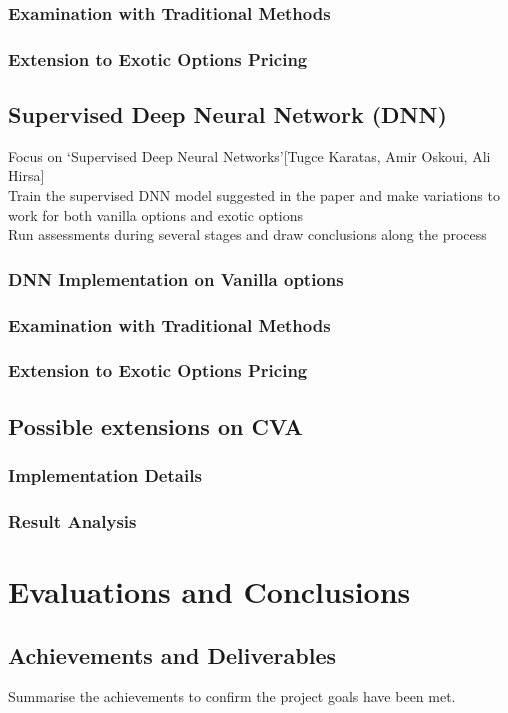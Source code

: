 \documentclass{report}
\begin{document}
\subsection{Examination with Traditional Methods}
\subsection{Extension to Exotic Options Pricing}

\section{Supervised Deep Neural Network (DNN)}
Focus on ‘Supervised Deep Neural Networks’[Tugce Karatas, Amir Oskoui, Ali Hirsa]\\
Train the supervised DNN model suggested in the paper and make variations to work for both vanilla options and exotic options\\
Run assessments during several stages and draw conclusions along the process

\subsection{DNN Implementation on Vanilla options}
\subsection{Examination with Traditional Methods}
\subsection{Extension to Exotic Options Pricing}

\section{Possible extensions on CVA}
\subsection{Implementation Details}
\subsection{Result Analysis}


\chapter{Evaluations and Conclusions}
\section{Achievements and Deliverables}
Summarise the achievements to confirm the project goals have been met.
\end{document}
